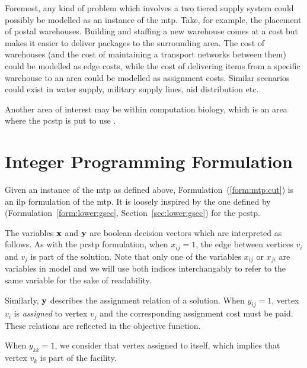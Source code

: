  Foremost, any kind of problem which involves a two tiered supply system could possibly be modelled as an instance of the
 \gls{mtp}. Take, for example, the placement of postal warehouses.
 Building and staffing a new warehouse comes at
 a cost but makes it easier to deliver packages to the surrounding area.
 The cost of warehouses (and the cost of maintaining
 a transport networks between them) could be modelled as edge costs, while the cost of delivering items from a specific warehouse to an area
 could be modelled as assignment costs.  Similar scenarios could exist in water supply, military supply lines, aid distribution etc.

 Another area of interest may be within computation biology, which is an area where the \gls{pcstp} is put to use
 \citep{akhmedov2016divide, sun2018classical}.
\section{Integer Programming Formulation}

Given an instance of the \gls{mtp} as defined above,
Formulation~(\ref{form:mtp:cut}) is an \gls{ilp} formulation of the \gls{mtp}.
It is loosely inspired by the one defined by \citet{lucena2004strong}
(Formulation~\ref{form:lower:gsec}, Section~\ref{sec:lower:gsec}) for the
\gls{pcstp}.

The variables $\mathbf{x}$ and $\mathbf{y}$ are boolean
decision vectors which are interpreted as follows.
As with the \gls{pcstp} formulation, when $x_{ij} = 1$,
the edge between vertices $v_i$ and $v_j$ is part of the solution.
Note that only
one of the variables $x_{ij}$ or $x_{ji}$ are variables
in model and we will use both indices interchangably
to refer to the same variable for the sake of readability.

Similarly, $\mathbf{y}$ describes the assignment relation of a solution. When
$y_{ij} = 1$, vertex $v_i$ is \textit{assigned} to vertex $v_j$ and the corresponding
assignment cost must be paid.
These relations are reflected in the objective function.

When $y_{kk} = 1$, we consider that vertex assigned to
itself, which implies that vertex $v_k$ is part of the facility.

